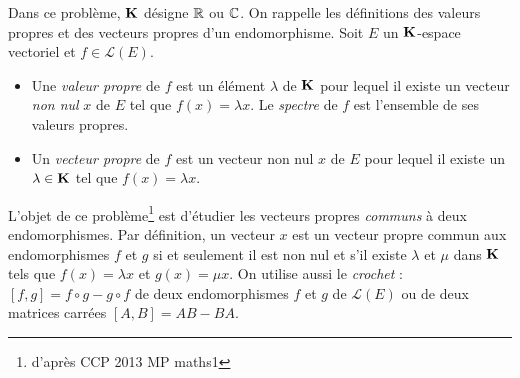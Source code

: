 Dans ce problème, $\mathbf{K}$ désigne $\mathbb{R}$ ou $\mathbb{C}$.\newline
On rappelle les définitions des valeurs propres et des vecteurs propres d'un endomorphisme. Soit $E$ un $\mathbf{K}$-espace vectoriel et $f\in \mathcal{L}(E)$.
\begin{itemize}
 \item  Une \emph{valeur propre} de $f$ est un élément $\lambda$ de $\mathbf{K}$ pour lequel il existe un vecteur \emph{non nul} $x$ de $E$ tel que $f(x)=\lambda x$. Le \emph{spectre} de $f$ est l'ensemble de ses valeurs propres.
 \item  Un \emph{vecteur propre} de $f$ est un vecteur non nul $x$ de $E$ pour lequel il existe un $\lambda\in \mathbf{K}$ tel que $f(x)=\lambda x$.  
\end{itemize}
L'objet de ce problème\footnote{d'après CCP 2013 MP maths1} est d'étudier les vecteurs propres \emph{communs} à deux endomorphismes. 
Par définition, un vecteur $x$ est un vecteur propre commun aux endomorphismes $f$ et $g$ si et seulement il est non nul et s'il existe $\lambda$ et $\mu$ dans $\mathbf{K}$ tels que $f(x)=\lambda x$ et $g(x)=\mu x$.\newline
On utilise aussi le \emph{crochet} : $[f,g] = f\circ g - g\circ f$ de deux endomorphismes $f$ et $g$ de $\mathcal{L}(E)$ ou de deux matrices carrées $[A,B] = AB-BA$. 

